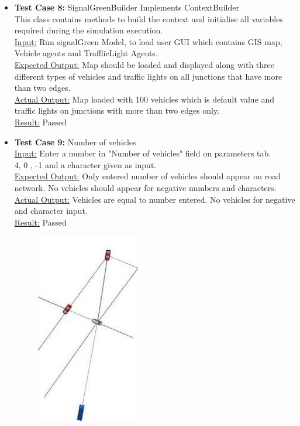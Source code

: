 \documentclass[11pt]{article}
\begin{document}
\begin{enumerate}
\begin{itemize}
\begin{itemize}
\item \textbf{Test Case 8:} SignalGreenBuilder Implements ContextBuilder\hfill \\
This class contains methods to build the context and initialise all variables required during the simulation execution.\hfil \\
\underline{Input:} Run signalGreen Model, to load user GUI which contains GIS map, Vehicle agents and TrafflicLight Agents.\hfill \\
\underline{Expected Output:} Map should be loaded and displayed along with three different types of vehicles and traffic lights on all junctions that have more than two edges.\hfill \\
\underline{Actual Output:} Map loaded with 100 vehicles which is default value and traffic lights on junctions with more than two edges only.\hfill \\
\underline{Result:} Passed
\item\textbf{Test Case 9:} Number of vehicles\hfill \\
\underline{Input:} Enter a number in "Number of vehicles" field on parameters tab.\hfill \\
4, 0 , -1 and a character given as input.\hfill \\
\underline{Expected Output:} Only entered number of vehicles should appear on road network. No vehicles should appear for negative numbers and characters. \hfill \\
\underline{Actual Output:} Vehicles are equal to number entered. No vehicles for negative and character input.\hfil \\
\underline{Result:} Passed\hfil \\
\begin{figure}[h]
\begin{center}
\includegraphics[scale=0.8]{4cars}

\end{center}
\end{figure}
\end{itemize}
\end{itemize}
\end{enumerate}
\end{document}
